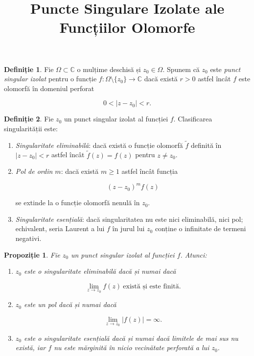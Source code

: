 \documentclass[12pt]{article}
\title{Puncte Singulare Izolate ale Funcțiilor Olomorfe}
\author{}
\date{}
\theoremstyle{definition}
\newtheorem{definition}{Definiție}
\theoremstyle{plain}
\newtheorem{proposition}{Propoziție}
\begin{document}
\maketitle

\begin{definition}
Fie $\Omega \subset \mathbb{C}$ o mulțime deschisă și $z_0 \in \Omega$. Spunem că $z_0$ este
\emph{punct singular izolat} pentru o funcție $f : \Omega \setminus \{z_0\} \to \mathbb{C}$ dacă
există $r > 0$ astfel încât $f$ este olomorfă în domeniul perforat


\[
0 < |z - z_0| < r.
\]


\end{definition}

\begin{definition}
Fie $z_0$ un punct singular izolat al funcției $f$. Clasificarea singularității este:
\begin{enumerate}
    \item[(i)] \emph{Singularitate eliminabilă}: dacă există o funcție olomorfă $\tilde f$ definită
    în $|z - z_0| < r$ astfel încât $\tilde f(z) = f(z)$ pentru $z \ne z_0$.

    \item[(ii)] \emph{Pol de ordin $m$}: dacă există $m \ge 1$ astfel încât funcția
    

\[
    (z - z_0)^m f(z)
    \]


    se extinde la o funcție olomorfă nenulă în $z_0$.

    \item[(iii)] \emph{Singularitate esențială}: dacă singularitatea nu este nici eliminabilă,
    nici pol; echivalent, seria Laurent a lui $f$ în jurul lui $z_0$ conține o infinitate de termeni negativi.
\end{enumerate}
\end{definition}

\begin{proposition}
Fie $z_0$ un punct singular izolat al funcției $f$. Atunci:
\begin{enumerate}
    \item[(i)] $z_0$ este o singularitate eliminabilă dacă și numai dacă
    

\[
    \lim_{z \to z_0} f(z) \ \text{există și este finită}.
    \]



    \item[(ii)] $z_0$ este un pol dacă și numai dacă
    

\[
    \lim_{z \to z_0} |f(z)| = \infty.
    \]



    \item[(iii)] $z_0$ este o singularitate esențială dacă și numai dacă limitele de mai sus nu există,
    iar $f$ nu este mărginită în nicio vecinătate perforată a lui $z_0$.
\end{enumerate}
\end{proposition}
\end{document}
